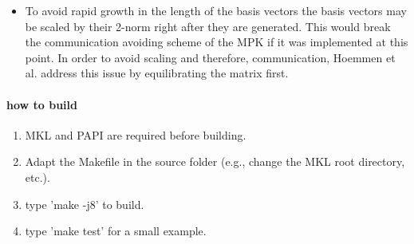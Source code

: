 \documentclass{scrartcl}
\numberwithin{equation}{section}
\begin{document}
\begin{itemize}
\item To avoid rapid growth in the length of the basis vectors the basis vectors may be scaled by their 2-norm right after they are generated. This would break the communication avoiding scheme of the MPK if it was implemented at this point. In order to avoid scaling and therefore, communication, Hoemmen et al. \cite{Hoemmen:2010:CKS:1970638} address this issue by equilibrating the matrix first.
\end{itemize}

\paragraph{how to build}
\begin{enumerate}
\item MKL and PAPI are required before building.
\item Adapt the Makefile in the source folder (e.g., change the MKL root directory, etc.).
\item type 'make -j8' to build.
\item type 'make test' for a small example.
\end{enumerate}
\end{document}
